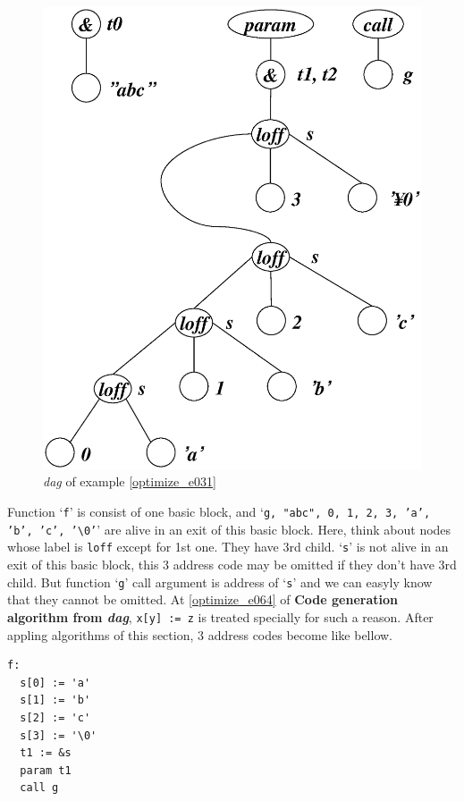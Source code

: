 \begin{Example}
\begin{figure}[htbp]
\begin{center}
\begin{latexonly}
\includegraphics[width=1.0\linewidth,height=1.2\linewidth]{opt016.eps}
\end{latexonly}
\caption{{\em dag} of example \ref{optimize_e031}}
\label{optimize_e032}
\end{center}
\end{figure}
Function `{\tt{f}}' is consist of one basic block, and 
`{\tt{g, "abc", 0, 1, 2, 3, 'a', 'b', 'c', '\verb|\|0'}}'
are alive in an exit of this basic block.
Here, think about nodes whose label is {\tt{loff}} except for 1st one.
They have 3rd child.
`{\tt{s}}' is not alive in an exit of this basic block,
this 3 address code may be omitted if they don't have 3rd child.
But function `{\tt{g}}' call argument is address of `{\tt{s}}'
and we can easyly know that they cannot be omitted.
At \ref{optimize_e064} of {\bf Code generation algorithm from {\em dag}},
{\tt{x[y] := z}} is treated specially for such a reason.
After appling algorithms of this section,
3 address codes become like bellow.
\begin{verbatim}
f:
  s[0] := 'a'
  s[1] := 'b'
  s[2] := 'c'
  s[3] := '\0'
  t1 := &s
  param t1
  call g
\end{verbatim}
\end{Example}

